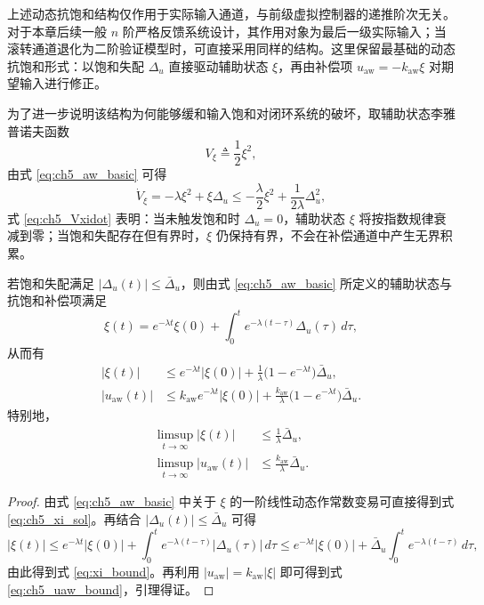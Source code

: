 上述动态抗饱和结构仅作用于实际输入通道，与前级虚拟控制器的递推阶次无关。对于本章后续一般 $n$ 阶严格反馈系统设计，其作用对象为最后一级实际输入；当滚转通道退化为二阶验证模型时，可直接采用同样的结构。这里保留最基础的动态抗饱和形式：以饱和失配 $\Delta_u$ 直接驱动辅助状态 $\xi$，再由补偿项 $u_{\mathrm{aw}}=-k_{\mathrm{aw}}\xi$ 对期望输入进行修正。

为了进一步说明该结构为何能够缓和输入饱和对闭环系统的破坏，取辅助状态李雅普诺夫函数
\begin{equation}\label{eq:ch5_Vxi}
  V_\xi\triangleq \frac{1}{2}\xi^2,
\end{equation}
由式 \eqref{eq:ch5_aw_basic} 可得
\begin{equation}\label{eq:ch5_Vxidot}
  \dot V_\xi
  =-\lambda \xi^2+\xi\Delta_u
  \le -\frac{\lambda}{2}\xi^2+\frac{1}{2\lambda}\Delta_u^2,
\end{equation}
式 \eqref{eq:ch5_Vxidot} 表明：当未触发饱和时 $\Delta_u=0$，辅助状态 $\xi$ 将按指数规律衰减到零；当饱和失配存在但有界时，$\xi$ 仍保持有界，不会在补偿通道中产生无界积累。

\begin{lemma}\label{lem:ch5_aw1}\hfill\cite{ref16}
若饱和失配满足 $|\Delta_u(t)|\le \bar\Delta_u$，则由式 \eqref{eq:ch5_aw_basic} 所定义的辅助状态与抗饱和补偿项满足
\begin{equation}\label{eq:ch5_xi_sol}
  \xi(t)=e^{-\lambda t}\xi(0)+\int_0^t e^{-\lambda (t-\tau)}\Delta_u(\tau)\,d\tau,
\end{equation}
从而有
\begin{subequations}
\begin{align}
  |\xi(t)|
  &\le e^{-\lambda t}|\xi(0)|
  +\frac{1}{\lambda}\bigl(1-e^{-\lambda t}\bigr)\bar\Delta_u, \label{eq:xi_bound}\\
  |u_{\mathrm{aw}}(t)|
  &\le k_{\mathrm{aw}}e^{-\lambda t}|\xi(0)|
  +\frac{k_{\mathrm{aw}}}{\lambda}\bigl(1-e^{-\lambda t}\bigr)\bar\Delta_u. \label{eq:ch5_uaw_bound}
\end{align}
\end{subequations}
特别地，
\begin{subequations}
\begin{align}
  \limsup_{t\to\infty}|\xi(t)| &\le \frac{1}{\lambda}\bar\Delta_u,\\
  \limsup_{t\to\infty}|u_{\mathrm{aw}}(t)| &\le \frac{k_{\mathrm{aw}}}{\lambda}\bar\Delta_u.
\end{align}
\end{subequations}
\end{lemma}
\begin{proof}
由式 \eqref{eq:ch5_aw_basic} 中关于 $\xi$ 的一阶线性动态作常数变易可直接得到式 \eqref{eq:ch5_xi_sol}。再结合 $|\Delta_u(t)|\le \bar\Delta_u$ 可得
\begin{equation}
  |\xi(t)|
  \le e^{-\lambda t}|\xi(0)|
  +\int_0^t e^{-\lambda (t-\tau)}|\Delta_u(\tau)|\,d\tau
  \le e^{-\lambda t}|\xi(0)|
  +\bar\Delta_u\int_0^t e^{-\lambda (t-\tau)}\,d\tau,
\end{equation}
由此得到式 \eqref{eq:xi_bound}。再利用 $|u_{\mathrm{aw}}|=k_{\mathrm{aw}}|\xi|$ 即可得到式 \eqref{eq:ch5_uaw_bound}，引理得证。
\end{proof}

